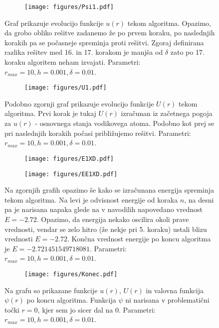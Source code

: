 \documentclass{article}
\begin{document}
\begin{figure}[H]
\centering
\begin{subfigure}{.7\textwidth}
\texttt{[image: figures/Psi1.pdf]}
\end{subfigure}
\caption*{Graf prikazuje evolucijo funkcije $u(r)$ tekom algoritma. Opazimo, da grobo obliko rešitve zadanemo že po prvem koraku, po naslednjih korakih pa se počasneje spreminja proti rešitvi. Zgoraj definirana razlika rešitev med 16. in 17. korakom je manjša od $\delta$ zato po 17. koraku algoritem neham izvajati. Parametri: $r_{max}=10, h=0.001, \delta=0.01$.}
\end{figure}

\begin{figure}[H]
\centering
\begin{subfigure}{.7\textwidth}
\texttt{[image: figures/U1.pdf]}
\end{subfigure}
\caption*{Podobno zgornji graf prikazuje evolucijo funkcije $U(r)$ tekom algoritma. Prvi korak je tukaj $U(r)$ izračunan iz začetnega pogoja za $u(r)$ - osnovnega stanja vodikovega atoma. Podobno kot prej se pri naslednjih korakih počasi približujemo rešitvi. Parametri: $r_{max}=10, h=0.001, \delta=0.01$.}
\end{figure}

\begin{figure}[H]
\centering
\begin{subfigure}{.49\textwidth}
\texttt{[image: figures/E1XD.pdf]}
\end{subfigure}
\begin{subfigure}{.49\textwidth}
\texttt{[image: figures/EE1XD.pdf]}
\end{subfigure}
\caption*{Na zgornjih grafih opazimo še kako se izračunana energija spreminja tekom algoritma. Na levi je odvisnost energije od koraka $n$, na desni pa je narisana napaka glede na v navodilih napovedano vrednost $E=-2.72$. Opazimo, da energija nekako oscilira okoli prave vrednosti, vendar se zelo hitro (že nekje pri 5. koraku) ustali blizu vrednosti $E=-2.72$. Končna vrednost energije po koncu algoritma je $E=-2.721451549718081$. Parametri: $r_{max}=10, h=0.001, \delta=0.01$.}
\end{figure}

\begin{figure}[H]
\centering
\begin{subfigure}{.7\textwidth}
\texttt{[image: figures/Konec.pdf]}
\end{subfigure}
\caption*{Na grafu so prikazane funkcije $u(r)$, $U(r)$ in valovna funkcija $\psi(r)$ po koncu algoritma. Funkcija $\psi$ ni narisana v problematični točki $r=0$, kjer sem jo sicer dal na $0$.  Parametri: $r_{max}=10, h=0.001, \delta=0.01$.}
\end{figure}
\end{document}
